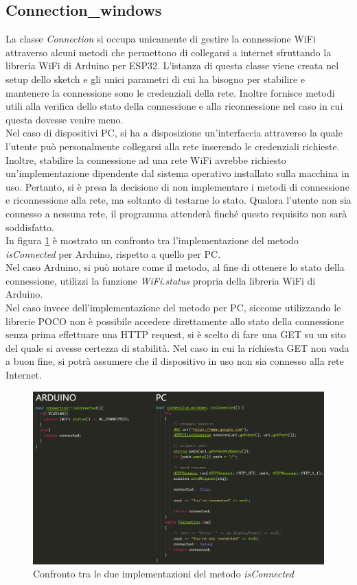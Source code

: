 \subsection{Connection\_windows}
La classe \textit{Connection} si occupa unicamente di gestire la connessione WiFi attraverso alcuni metodi che permettono di collegarsi a internet sfruttando la libreria WiFi di Arduino per ESP32. L'istanza di questa classe viene creata nel setup dello sketch e gli unici parametri di cui ha bisogno per stabilire e mantenere la connessione sono le credenziali della rete. Inoltre fornisce metodi utili alla verifica dello stato della connessione e alla riconnessione nel caso in cui questa dovesse venire meno.\\
Nel caso di dispositivi PC, si ha a disposizione un’interfaccia attraverso la quale l’utente può personalmente collegarsi alla rete inserendo le credenziali richieste. Inoltre, stabilire la connessione ad una rete WiFi avrebbe richiesto un’implementazione dipendente dal sistema operativo installato sulla macchina in uso. Pertanto, si è presa la decisione di non implementare i metodi di connessione e riconnessione alla rete, ma soltanto di testarne lo stato. Qualora l’utente non sia connesso a nessuna rete, il programma attenderà finché questo requisito non sarà soddisfatto.\\
In figura \ref{connAW} è mostrato un confronto tra l’implementazione del metodo \textit{isConnected} per Arduino, rispetto a quello per PC.\\
Nel caso Arduino, si può notare come il metodo, al fine di ottenere lo stato della connessione, utilizzi la funzione \textit{WiFi.status} propria della libreria WiFi di Arduino.\\
Nel caso invece dell'implementazione del metodo per PC, siccome utilizzando le librerie POCO non è possibile accedere direttamente allo stato della connessione senza prima effettuare una HTTP request, si è scelto di fare una GET su un sito del quale si avesse certezza di stabilità. Nel caso in cui la richiesta GET non vada a buon fine, si potrà assumere che il dispositivo in uso non sia connesso alla rete Internet.
\begin{figure}[H]
	\centering
	\includegraphics[width=\linewidth]{pics/connAW}
	\caption{Confronto tra le due implementazioni del metodo \textit{isConnected}}
	\label{connAW}
\end{figure}
